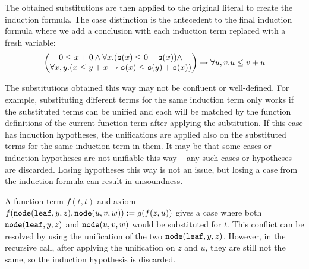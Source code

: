 The obtained substitutions are then applied to the original literal to create the induction formula. The case distinction is the antecedent to the final induction formula where we add a conclusion with each induction term replaced with a fresh variable:
$$\begin{pmatrix}0\leq x+0\land\forall x.(\mathtt{s}(x)\leq 0+\mathtt{s}(x))\land\\
\forall x,y.(x\leq y+x\rightarrow \mathtt{s}(x)\leq \mathtt{s}(y)+\mathtt{s}(x))\end{pmatrix}\rightarrow \forall u,v.u\leq v+u$$

The substitutions obtained this way may not be confluent or well-defined. For example, substituting different terms for the same induction term only works if the substituted terms can be unified and each will be matched by the function definitions of the current function term after applying the subtitution. If this case has induction hypotheses, the unifications are applied also on the substituted terms for the same induction term in them. It may be that some cases or induction hypotheses are not unifiable this way -- any such cases or hypotheses are discarded. Losing hypotheses this way is not an issue, but losing a case from the induction formula can result in unsoundness.

\begin{example}
	A function term $f(t,t)$ and axiom $f(\mathtt{node}(\mathtt{leaf},y,z),\mathtt{node}(u,v,w)):=g(f(z,u))$ gives a case where both $\mathtt{node}(\mathtt{leaf},y,z)$ and $\mathtt{node}(u,v,w)$ would be substituted for $t$. This conflict can be resolved by using the unification of the two $\mathtt{node}(\mathtt{leaf},y,z)$. However, in the recursive call, after applying the unification on $z$ and $u$, they are still not the same, so the induction hypothesis is discarded.
\end{example}

